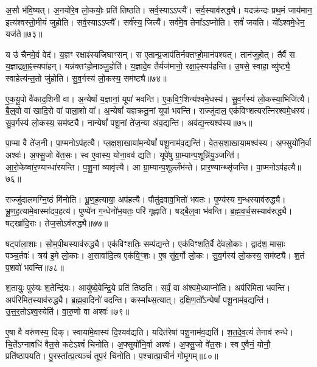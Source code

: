अ॒सौ भ॑वि॒ष्यत्।
अ॒नयो॑रे॒व लो॒कयोः॒ प्रति॑ तिष्ठति।
सर्व॒स्याऽऽप्त्यै᳚।
सर्व॒स्या\-व॑\-रुद्ध्यै।
यदक्र॑न्दः प्रथ॒मं जाय॑मान॒ इत्य॑श्वस्तो॒मीयं॑ जुहोति।
सर्व॒स्याऽऽप्त्यै᳚।
सर्व॑स्य॒ जित्यै᳚।
सर्व॑मे॒व तेना᳚ऽऽप्नोति।
सर्वं॑ जयति।
यो᳚ऽश्वमे॒धेन॒ यज॑ते॥७३॥\ip

य उ॑ चैनमे॒वं वेद॑।
य॒ज्ञꣳ रक्षाꣴ॑स्यजिघाꣳसन्।
स ए॒तान्प्र॒जा\-प॑तिर्नक्तꣳहो॒मान॑पश्यत्।
तान॑जुहोत्।
तैर्वै स य॒ज्ञाद्रक्षा॒ꣴ॒स्यपा॑हन्।
यन्न॑क्तꣳहो॒माञ्जु॒होति॑।
य॒ज्ञादे॒व तैर्यज॑मानो॒ रक्षा॒ꣴ॒स्यप॑हन्ति।
उ॒षसे॒ स्वाहा॒ व्यु॑ष्ट्यै॒ स्वाहेत्य॑न्त॒तो जु॑होति।
सु॒व॒र्गस्य॑ लो॒कस्य॒ सम॑ष्ट्यै॥७४॥\ip\anuvakamend[वै नभाꣳ॑सि॒ सूर्यो॒ ज्योतिः॒ सन्त॑त्यै॒ सम॑ष्ट्यै भू॒तं यज॑ते॒ नव॑ च]

ए॒क॒यू॒पो वै॑काद॒शिनी॑ वा।
अ॒न्येषां᳚ य॒ज्ञानां॒ यूपा॑ भवन्ति।
ए॒क॒वि॒ꣳ॒शिन्य॑श्वमे॒धस्य॑।
सु॒व॒र्गस्य॑ लो॒कस्या॒भिजि॑त्यै।
बै॒ल्॒वो वा॑ खादि॒रो वा॑ पाला॒शो वा᳚।
अ॒न्येषां᳚ यज्ञक्रतू॒नां यूपा॑ भवन्ति।
राज्जु॑दाल॒ एक॑विꣳशत्यरत्निरश्वमे॒धस्य॑।
सु॒व॒र्गस्य॑ लो॒कस्य॒ सम॑ष्ट्यै।
नान्येषां᳚ पशू॒नां ते॑ज॒न्या अ॑व॒द्यन्ति॑।
अव॑द्य॒न्त्यश्व॑स्य॥७५॥\ip

पा॒प्मा वै ते॑ज॒नी।
पा॒प्मनो\-ऽप॑हत्यै।
प्ल॒क्ष॒शा॒खाया॑म॒न्येषां᳚ पशू॒नाम॑व॒द्यन्ति॑।
वे॒त॒स॒शा॒खाया॒मश्व॑स्य।
अ॒फ्सुयो॑नि॒र्वा अश्वः॑।
अ॒फ्सु॒जो वे॑त॒सः।
स्व ए॒वास्य॒ योना॒वव॑ द्यति।
यूपे॑षु ग्रा॒म्यान्\-प॒शून्नि॑यु॒ञ्जन्ति॑।
आ॒रो॒केष्वा॑र॒ण्यान्धा॑रयन्ति।
प॒शू॒नां व्यावृ॑त्त्यै।
आ ग्रा॒म्यान्प॒शूल्लँभ॑न्ते।
प्रार॒ण्यान्थ्सृ॑जन्ति।
पा॒प्मनो\-ऽप॑हत्यै॥७६॥\ip\anuvakamend[अश्व॑स्य॒ व्यावृ॑त्त्यै॒ त्रीणि॑ च]

राज्जु॑दालमग्नि॒ष्ठं मि॑नोति।
भ्रू॒ण॒ह॒त्याया॒ अप॑हत्यै।
पौतु॑द्रवाव॒भितो॑ भवतः।
पुण्य॑स्य ग॒न्धस्या\-व॑\-रुद्ध्यै।
भ्रू॒ण॒ह॒त्या\-मे॒वा\-स्मा॑दप॒हत्य॑।
पुण्ये॑न ग॒न्धेनो॑भ॒यतः॒ परि॑ गृह्णाति।
षड्बै॒ल्॒वा भ॑वन्ति।
ब्र॒ह्म॒व॒र्च॒सस्या\-व॑\-रुद्ध्यै।
षट्खा॑दि॒राः।
तेज॒सो\-ऽव॑रुद्ध्यै॥७७॥\ip

षट्पा॑ला॒शाः।
सो॒म॒पी॒थस्या\-व॑\-रुद्ध्यै।
एक॑विꣳशतिः॒ सम्प॑द्यन्ते।
एक॑विꣳशति॒र्वै दे॑वलो॒काः।
द्वाद॑श॒ मासाः॒ पञ्च॒र्तवः॑।
त्रय॑ इ॒मे लो॒काः।
अ॒सावा॑दि॒त्य एक॑वि॒ꣳ॒शः।
ए॒ष सु॑व॒र्गो लो॒कः।
सु॒व॒र्गस्य॑ लो॒कस्य॒ सम॑ष्ट्यै।
श॒तं प॒शवो॑ भवन्ति॥७८॥\ip

श॒तायुः॒ पुरु॑षः श॒तेन्द्रि॑यः।
आयु॑ष्ये॒वेन्द्रि॒ये प्रति॑ तिष्ठति।
सर्वं॒ वा अ॑श्वमे॒ध्याप्नो॑ति।
अप॑रिमिता भवन्ति।
अप॑रिमित॒स्या\-व॑\-रुद्ध्यै।
ब्र॒ह्म॒वा॒दिनो॑ वदन्ति।
कस्मा᳚थ्स॒त्यात्।
द॒क्षि॒ण॒तो᳚\-ऽन्येषां᳚ पशू॒ना\-म॑व॒\-द्यन्ति॑।
उ॒त्त॒र॒तो\-ऽश्व॒स्येति॑।
वा॒रु॒णो वा अश्वः॑॥७९॥\ip

ए॒षा वै वरु॑णस्य॒ दिक्।
स्वाया॑मे॒वास्य॑ दि॒श्यव॑द्यति।
यदित॑रेषां पशू॒नाम॑व॒द्यति॑।
श॒त॒दे॒व॒त्यं॑ तेनाव॑ रुन्धे।
चि॒ते᳚\-ऽग्नावधि॑ वैत॒से कटे\-ऽश्वं॑ चिनोति।
अ॒फ्सुयो॑नि॒र्वा अश्वः॑।
अ॒फ्सु॒जो वे॑त॒सः।
स्व ए॒वैनं॒ योनौ॒ प्रति॑\-ष्ठापयति।
पु॒रस्ता᳚त्प्र॒त्यञ्चं॑ तूप॒रं चि॑नोति।
प॒श्चात्प्रा॒चीनं॑ गोमृ॒गम्॥८०॥\ip

